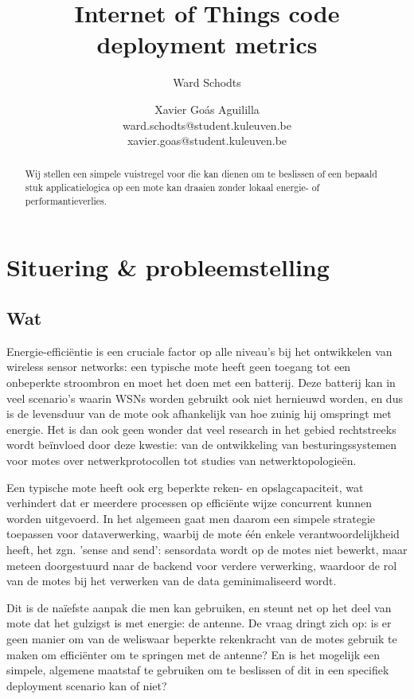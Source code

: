 \documentclass{article}
\title{Internet of Things code deployment metrics}
\author{Ward Schodts \and Xavier Go\'as Aguililla \\ ward.schodts@student.kuleuven.be \\ xavier.goas@student.kuleuven.be}
\begin{document}
\maketitle

\begin{abstract}
Wij stellen een simpele vuistregel voor die kan dienen om te beslissen of een
bepaald stuk applicatielogica op een mote kan draaien zonder lokaal energie- of
performantieverlies.
  
\end{abstract}

\section{Situering \& probleemstelling}


\subsection{Wat}

Energie-effici\"entie is een cruciale factor op alle niveau's bij het
ontwikkelen van wireless sensor networks: een typische mote heeft geen toegang
tot een onbeperkte stroombron en moet het doen met een batterij. Deze batterij
kan in veel scenario's waarin WSNs worden gebruikt ook niet hernieuwd worden, en
dus is de levensduur van de mote ook afhankelijk van hoe zuinig hij omspringt
met energie. Het is dan ook geen wonder dat veel research in het gebied
rechtstreeks wordt be\"invloed door deze kwestie: van de ontwikkeling van
besturingssystemen voor motes over netwerkprotocollen tot studies van
netwerktopologie\"en.

Een typische mote heeft ook erg beperkte reken- en opslagcapaciteit, wat
verhindert dat er meerdere processen op effici\"ente wijze concurrent kunnen
worden uitgevoerd. In het algemeen gaat men daarom een simpele strategie
toepassen voor dataverwerking, waarbij de mote \'e\'en enkele
verantwoordelijkheid heeft, het zgn. 'sense and send': sensordata wordt op de
motes niet bewerkt, maar meteen doorgestuurd naar de backend voor verdere
verwerking, waardoor de rol van de motes bij het verwerken van de data
geminimaliseerd wordt.

Dit is de na\"iefste aanpak die men kan gebruiken, en steunt net op het deel van
mote dat het gulzigst is met energie: de antenne.  De vraag dringt zich op: is
er geen manier om van de weliswaar beperkte rekenkracht van de motes gebruik te
maken om effici\"enter om te springen met de antenne? En is het mogelijk een
simpele, algemene maatstaf te gebruiken om te beslissen of dit in een specifiek
deployment scenario kan of niet?
\end{document}

